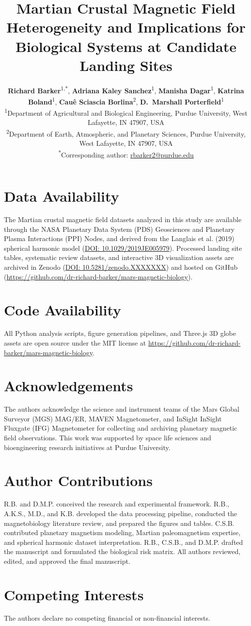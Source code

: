 \documentclass{npj-article}
\title{Martian Crustal Magnetic Field Heterogeneity and Implications for Biological Systems at Candidate Landing Sites}
\author{%
  \textbf{Richard Barker}\textsuperscript{1,*},
  \textbf{Adriana Kaley Sanchez}\textsuperscript{1},
  \textbf{Manisha Dagar}\textsuperscript{1},
  \textbf{Katrina Boland}\textsuperscript{1},
  \textbf{Cau\^{e} Sciascia Borlina}\textsuperscript{2},
  \textbf{D.~Marshall Porterfield}\textsuperscript{1}
  \vspace{2mm}\\
  \textsuperscript{1}\footnotesize Department of Agricultural and Biological Engineering, Purdue University, West Lafayette, IN 47907, USA\\
  \textsuperscript{2}\footnotesize Department of Earth, Atmospheric, and Planetary Sciences, Purdue University, West Lafayette, IN 47907, USA\\
  \textsuperscript{*}\footnotesize Corresponding author: \href{mailto:rbarker2@purdue.edu}{rbarker2@purdue.edu}
}
\begin{document}
\makefrontmatter







\section*{Data Availability}
The Martian crustal magnetic field datasets analyzed in this study are available through the NASA Planetary Data System (PDS) Geosciences and Planetary Plasma Interactions (PPI) Nodes, and derived from the Langlais et al. (2019) spherical harmonic model (\href{https://doi.org/10.1029/2019JE005979}{DOI: 10.1029/2019JE005979}). Processed landing site tables, systematic review datasets, and interactive 3D visualization assets are archived in Zenodo (\href{https://doi.org/10.5281/zenodo.XXXXXXX}{DOI: 10.5281/zenodo.XXXXXXX}) and hosted on GitHub (\url{https://github.com/dr-richard-barker/mars-magnetic-biology}).

\section*{Code Availability}
All Python analysis scripts, figure generation pipelines, and Three.js 3D globe assets are open source under the MIT license at \url{https://github.com/dr-richard-barker/mars-magnetic-biology}.

\section*{Acknowledgements}
The authors acknowledge the science and instrument teams of the Mars Global Surveyor (MGS) MAG/ER, MAVEN Magnetometer, and InSight InSight Fluxgate (IFG) Magnetometer for collecting and archiving planetary magnetic field observations. This work was supported by space life sciences and bioengineering research initiatives at Purdue University.

\section*{Author Contributions}
R.B. and D.M.P. conceived the research and experimental framework. R.B., A.K.S., M.D., and K.B. developed the data processing pipeline, conducted the magnetobiology literature review, and prepared the figures and tables. C.S.B. contributed planetary magnetism modeling, Martian paleomagnetism expertise, and spherical harmonic dataset interpretation. R.B., C.S.B., and D.M.P. drafted the manuscript and formulated the biological risk matrix. All authors reviewed, edited, and approved the final manuscript.

\section*{Competing Interests}
The authors declare no competing financial or non-financial interests.

\renewcommand{\bibnumfmt}[1]{#1.}


\end{document}
